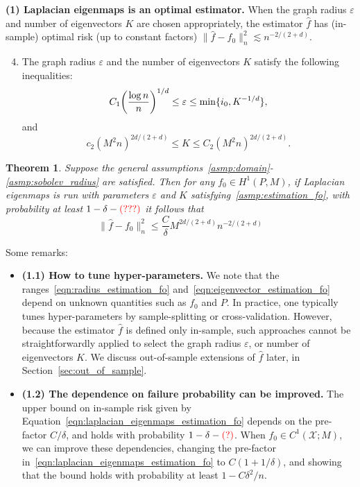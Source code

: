 \documentclass{article}
\newcommand{\1}{\mathbf{1}}
\newcommand{\mc}[1]{\mathcal{#1}}
\newcommand{\wh}[1]{\widehat{#1}}
\theoremstyle{alden}
\theoremstyle{aldenthm}
\newtheorem{theorem}{Theorem}
\theoremstyle{definition}
\theoremstyle{remark}
\begin{document}
\textbf{(1) Laplacian eigenmaps is an optimal estimator.} When the graph radius $\varepsilon$ and number of eigenvectors $K$ are chosen appropriately, the estimator $\wh{f}$ has (in-sample) optimal risk (up to constant factors) $\|\wh{f} - f_0\|_n^2 \lesssim n^{-2/(2 + d)}$. 
\begin{enumerate}[label=(A\arabic*)]
	\setcounter{enumi}{3}
	\item 
	\label{asmp:estimation_fo} 
	The graph radius $\varepsilon$ and the number of eigenvectors $K$ satisfy the following inequalities:
	\begin{equation}\\
	\label{eqn:radius_estimation_fo} 
	C_1 \biggl(\frac{\log n}{n}\biggr)^{1/d} \leq \varepsilon \leq \min\{i_0,K^{-1/d}\},
	\end{equation}
	and 
	\begin{equation}
	\label{eqn:eigenvector_estimation_fo} 
	c_2 (M^2 n)^{2d/(2 + d)}\leq K \leq C_2 (M^2 n)^{2d/(2 + d)}.
	\end{equation}
\end{enumerate}
\begin{theorem}
	\label{thm:laplacian_eigenmaps_estimation_fo}
	Suppose the general assumptions~\ref{asmp:domain}-\ref{asmp:sobolev_radius} are satisfied. Then for any $f_0 \in H^1(P,M)$, if Laplacian eigenmaps is run with parameters $\varepsilon$ and $K$ satisfying~\ref{asmp:estimation_fo}, with probability at least $1 - \delta - \textcolor{red}{(???)}$ it follows that
	\begin{equation}
	\label{eqn:laplacian_eigenmaps_estimation_fo}
	\|\wh{f} - f_0\|_n^2 \leq \frac{C}{\delta}M^{2d/(2 + d)}n^{-2/(2 + d)}
	\end{equation}
\end{theorem}
Some remarks:
\begin{itemize}
	\item \textbf{(1.1) How to tune hyper-parameters.} We note that the ranges~\eqref{eqn:radius_estimation_fo} and~\eqref{eqn:eigenvector_estimation_fo} depend on unknown quantities such as $f_0$ and $P$. In practice, one typically tunes hyper-parameters by sample-splitting or cross-validation. However, because the estimator $\wh{f}$ is defined only in-sample, such approaches cannot be straightforwardly applied to select the graph radius $\varepsilon$, or number of eigenvectors $K$. We discuss out-of-sample extensions of $\wh{f}$ later, in Section~\ref{sec:out_of_sample}.
	\item \textbf{(1.2) The dependence on failure probability can be improved.} The upper bound on in-sample risk given by Equation~\eqref{eqn:laplacian_eigenmaps_estimation_fo} depends on the pre-factor $C/\delta$, and holds with probability $1 - \delta - \textcolor{red}{(?)}$. When $f_0 \in C^1(\mc{X};M)$, we can improve these dependencies, changing the pre-factor in~\eqref{eqn:laplacian_eigenmaps_estimation_fo} to $C(1 + 1/\delta)$, and showing that the bound holds with probability at least $1 - C\delta^2/n$. 
\end{itemize}
\end{document}
